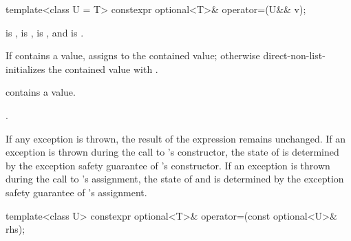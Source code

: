 %
\begin{itemdecl}
template<class U = T> constexpr optional<T>& operator=(U&& v);
\end{itemdecl}

\begin{itemdescr}
\pnum
\constraints
{} is ,
 is ,
 is , and
 is .

\pnum
\effects
If  contains a value, assigns  to the contained value; otherwise direct-non-list-initializes the contained value with .

\pnum
\ensures
{} contains a value.

\pnum
\returns
{}.

\pnum
\remarks
If any exception is thrown, the result of the expression  remains unchanged. If an exception is thrown during the call to 's constructor, the state of  is determined by the exception safety guarantee of 's constructor. If an exception is thrown during the call to 's assignment, the state of  and  is determined by the exception safety guarantee of 's assignment.
\end{itemdescr}

%
\begin{itemdecl}
template<class U> constexpr optional<T>& operator=(const optional<U>& rhs);
\end{itemdecl}

